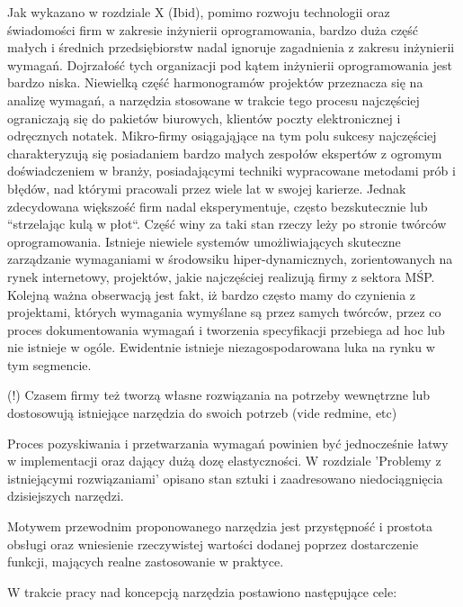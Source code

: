     Jak wykazano w rozdziale X (Ibid), pomimo rozwoju technologii oraz świadomości firm w zakresie inżynierii oprogramowania, bardzo duża część małych i średnich przedsiębiorstw nadal ignoruje zagadnienia z zakresu inżynierii wymagań. Dojrzałość tych organizacji pod kątem inżynierii oprogramowania jest bardzo niska. Niewielką część harmonogramów projektów przeznacza się na analizę wymagań, a narzędzia stosowane w trakcie tego procesu najczęściej ograniczają się do pakietów biurowych, klientów poczty elektronicznej i odręcznych notatek. Mikro-firmy osiągająjące na tym polu sukcesy najczęściej charakteryzują się posiadaniem bardzo małych zespołów ekspertów z ogromym doświadczeniem w branży, posiadającymi techniki wypracowane metodami prób i błędów, nad którymi pracowali przez wiele lat w swojej karierze.  Jednak zdecydowana większość firm nadal eksperymentuje, często bezskutecznie lub ``strzelając kulą w płot``. Część winy za taki stan rzeczy leży po stronie twórców oprogramowania. Istnieje niewiele systemów umożliwiających skuteczne zarządzanie wymaganiami w środowsiku hiper-dynamicznych, zorientowanych na rynek internetowy, projektów, jakie najczęściej realizują firmy z sektora MŚP. Kolejną ważna obserwacją jest fakt, iż bardzo często mamy do czynienia z projektami, których wymagania wymyślane są przez samych twórców, przez co proces dokumentowania wymagań i tworzenia specyfikacji przebiega ad hoc lub nie istnieje w ogóle. Ewidentnie istnieje niezagospodarowana luka na rynku w tym segmencie. 

    (!) Czasem firmy też tworzą własne rozwiązania na potrzeby wewnętrzne lub dostosowują istniejące narzędzia do swoich potrzeb (vide redmine, etc)

    Proces pozyskiwania i przetwarzania wymagań powinien być jednocześnie łatwy w implementacji oraz dający dużą dozę elastyczności. W rozdziale 'Problemy z istniejącymi rozwiązaniami' opisano stan sztuki i zaadresowano niedociągnięcia dzisiejszych narzędzi. 

    Motywem przewodnim proponowanego narzędzia jest przystępność i prostota obsługi oraz wniesienie rzeczywistej wartości dodanej poprzez dostarczenie funkcji, mających realne zastosowanie w praktyce. 

    W trakcie pracy nad koncepcją narzędzia postawiono następujące cele:
    
